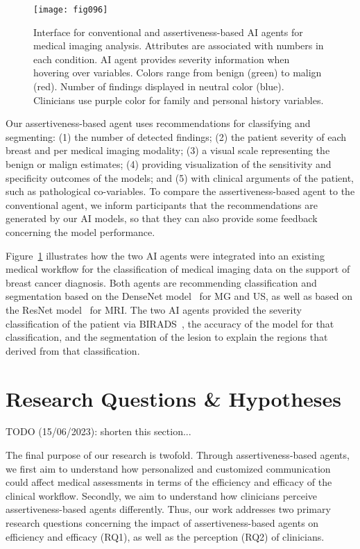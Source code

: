 \begin{figure}[htpb]
\centering
\texttt{[image: fig096]}
\caption[]{Interface for conventional and assertiveness-based AI agents for medical imaging analysis. Attributes are associated with numbers in each condition. AI agent provides severity information when hovering over variables. Colors range from benign (green) to malign (red). Number of findings displayed in neutral color (blue). Clinicians use purple color for family and personal history variables.}
\label{fig:fig096}
\end{figure}

Our assertiveness-based agent uses recommendations for classifying and segmenting:
(1) the number of detected findings;
(2) the patient severity of each breast and per medical imaging modality;
(3) a visual scale representing the benign or malign estimates;
(4) providing visualization of the sensitivity and specificity outcomes of the models; and
(5) with clinical arguments of the patient, such as pathological co-variables.
To compare the assertiveness-based agent to the conventional agent, we inform participants that the recommendations are generated by our AI models, so that they can also provide some feedback concerning the model performance.

Figure~\ref{fig:fig096} illustrates how the two AI agents were integrated into an existing medical workflow for the classification of medical imaging data on the support of breast cancer diagnosis.
Both agents are recommending classification and segmentation based on the DenseNet model~\cite{8721151} for MG and US, as well as based on the ResNet model~\cite{TALO2019101673} for MRI.
The two AI agents provided the severity classification of the patient via BIRADS~\cite{SPAK2017179}, the accuracy of the model for that classification, and the segmentation of the lesion to explain the regions that derived from that classification.

\section{Research Questions \& Hypotheses}
\label{sec:chap006004}

TODO (15/06/2023): shorten this section...

The final purpose of our research is twofold.
Through assertiveness-based agents, we first aim to understand how personalized and customized communication could affect medical assessments in terms of the efficiency and efficacy of the clinical workflow.
Secondly, we aim to understand how clinicians perceive assertiveness-based agents differently.
Thus, our work addresses two primary research questions concerning the impact of assertiveness-based agents on efficiency and efficacy (RQ1), as well as the perception (RQ2) of clinicians.

